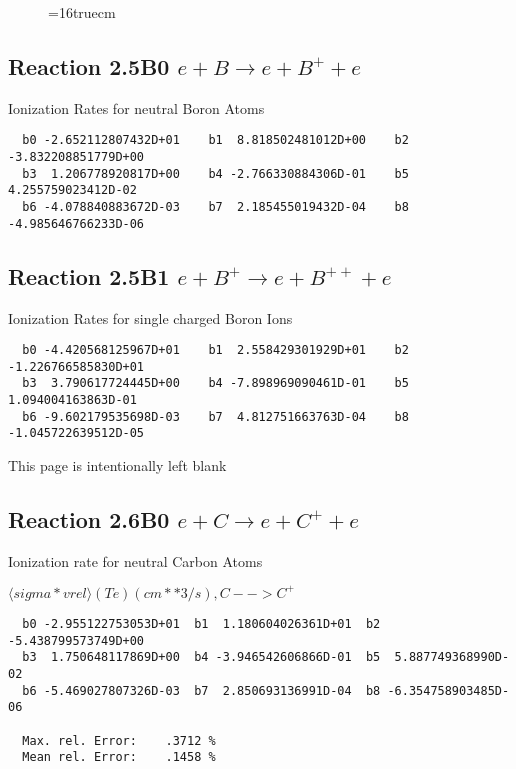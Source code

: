 \documentclass[12pt,dvipdfmx]{article}
\begin{document}
\begin{figure} \label{2.4B}
\epsfxsize=16truecm
\end{figure}
\newpage

\subsection{
Reaction 2.5B0   $e + B \rightarrow e + B^+ + e $
}

 Ionization Rates for neutral Boron Atoms


\begin{small}\begin{verbatim}
  b0 -2.652112807432D+01    b1  8.818502481012D+00    b2 -3.832208851779D+00
  b3  1.206778920817D+00    b4 -2.766330884306D-01    b5  4.255759023412D-02
  b6 -4.078840883672D-03    b7  2.185455019432D-04    b8 -4.985646766233D-06
\end{verbatim}\end{small}

\subsection{
Reaction 2.5B1   $e + B^+ \rightarrow e + B^{++} + e $
}

 Ionization Rates for single charged Boron Ions


\begin{small}\begin{verbatim}
  b0 -4.420568125967D+01    b1  2.558429301929D+01    b2 -1.226766585830D+01
  b3  3.790617724445D+00    b4 -7.898969090461D-01    b5  1.094004163863D-01
  b6 -9.602179535698D-03    b7  4.812751663763D-04    b8 -1.045722639512D-05
\end{verbatim}\end{small}

\newpage
This page is intentionally left blank
\newpage

\subsection{
Reaction 2.6B0   $e + C \rightarrow e + C^+ + e  $
}

  Ionization rate for neutral Carbon Atoms

  $ \langle sigma*vrel \rangle(Te)  (cm**3/s), C --> C^+$

\begin{small}\begin{verbatim}
  b0 -2.955122753053D+01  b1  1.180604026361D+01  b2 -5.438799573749D+00
  b3  1.750648117869D+00  b4 -3.946542606866D-01  b5  5.887749368990D-02
  b6 -5.469027807326D-03  b7  2.850693136991D-04  b8 -6.354758903485D-06

  Max. rel. Error:    .3712 %
  Mean rel. Error:    .1458 %





\end{verbatim}\end{small}
\end{document}
